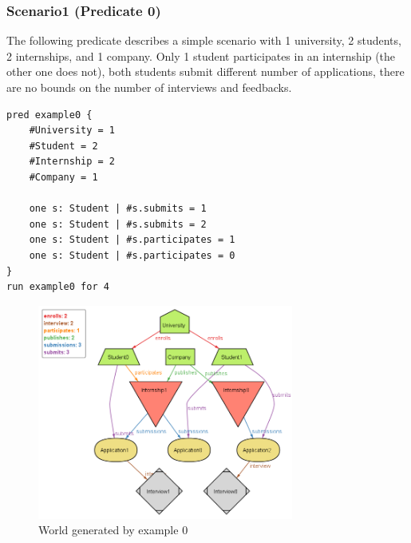 \subsubsection{Scenario1 (Predicate 0)}
The following predicate describes a simple scenario with 1 university, 2 students, 2 internships, and 1 company.
Only 1 student participates in an internship (the other one does not), both students submit different number of applications, 
there are no bounds on the number of interviews and feedbacks.
\begin{lstlisting}
pred example0 {
    #University = 1
    #Student = 2
    #Internship = 2
    #Company = 1

    one s: Student | #s.submits = 1
    one s: Student | #s.submits = 2
    one s: Student | #s.participates = 1
    one s: Student | #s.participates = 0
} 
run example0 for 4
\end{lstlisting}
\begin{figure}[H]
    \centering
    \includegraphics[width=0.75\textwidth]{Images/Alloy/example0.png}
    \caption{World generated by example 0}\label{fig:example0}
\end{figure}

